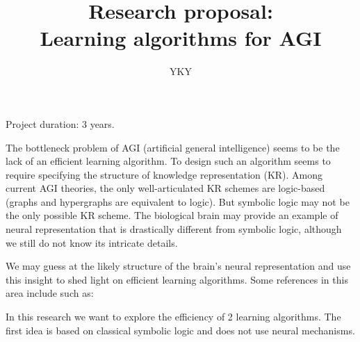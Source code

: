 

\usepackage{xeCJK}
\usepackage{color}
\usepackage{hyperref}
\usepackage{mathtools}



\title{{\small Research proposal:} \\ Learning algorithms for AGI}
\author{YKY}


\maketitle

Project duration: 3 years.

The bottleneck problem of AGI (artificial general intelligence) \parencite{Goertzel2007} seems to be the lack of an efficient learning algorithm.  To design such an algorithm seems to require specifying the structure of knowledge representation (KR).  Among current AGI theories, the only well-articulated KR schemes are logic-based (graphs and hypergraphs are equivalent to logic).  But symbolic logic may not be the only possible KR scheme.  The biological brain may provide an example of neural representation that is drastically different from symbolic logic, although we still do not know its intricate details.

We may guess at the likely structure of the brain's neural representation and use this insight to shed light on efficient learning algorithms.  Some references in this area include such as:
\begin{itemize}
	\item \cite{Garcez2009} 
	\item \cite{Omlin2000} 
	\item \cite{Go
	\item \cite{Smolensky2006}
\end{itemize}

In this research we want to explore the efficiency of 2 learning algorithms.  The first idea is based on classical symbolic logic and does not use neural mechanisms.

